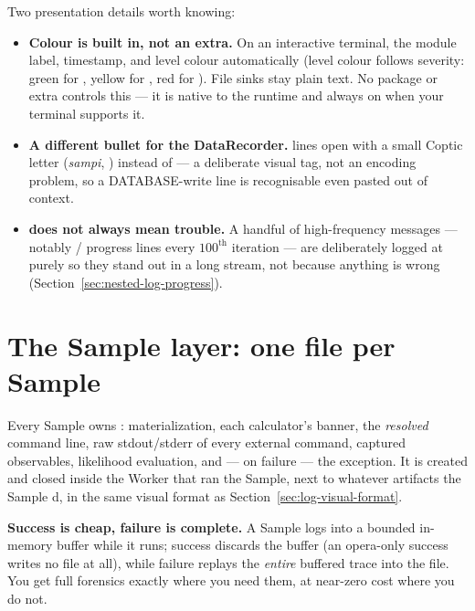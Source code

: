 Two presentation details worth knowing:

\begin{itemize}
  \item \textbf{Colour is built in, not an extra.} On an interactive terminal, the
        module label, timestamp, and level colour automatically (level colour follows
        severity: green for , yellow for , red for
        ). File sinks stay plain text. No package or extra controls
        this --- it is native to the runtime and always on when your terminal
        supports it.
  \item \textbf{A different bullet for the DataRecorder.}
         lines open with a small Coptic letter (\emph{sampi},
        ) instead of  --- a deliberate visual tag, not an
        encoding problem, so a DATABASE-write line is recognisable even pasted out
        of context.
  \item \textbf{ does not always mean trouble.} A handful of
        high-frequency messages --- notably /
        progress lines every $100^{\text{th}}$ iteration --- are deliberately logged
        at  purely so they stand out in a long  stream, not
        because anything is wrong (Section~\ref{sec:nested-log-progress}).
\end{itemize}

\section{The Sample layer: one file per Sample}
\label{sec:sample-logs}

Every Sample owns : materialization,
each calculator's banner, the \emph{resolved} command line, raw stdout/stderr of every
external command, captured observables, likelihood evaluation, and --- on failure ---
the exception. It is created and closed inside the Worker that ran the Sample, next to
whatever artifacts the Sample d, in the same visual format as
Section~\ref{sec:log-visual-format}.

\begin{jnote}
\textbf{Success is cheap, failure is complete.} A Sample logs into a bounded in-memory
buffer while it runs; success discards the buffer (an opera-only success writes no file
at all), while failure replays the \emph{entire} buffered trace into the file. You get
full forensics exactly where you need them, at near-zero cost where you do not.
\end{jnote}

